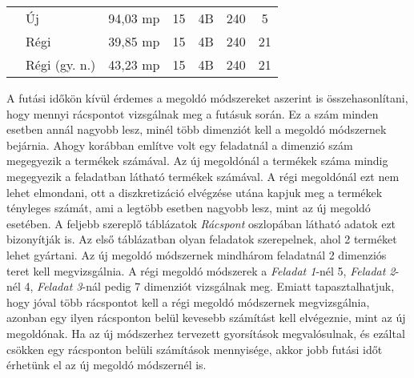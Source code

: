 \begin{table}[H]
\begin{center}
\begin{tabular}{|l|l|c|c|c|c|c|}
                                                 & Új                              & 94,03 mp    & 15           & 4B                & 240    & 5                             \\ \cline{2-7} 
                                                 & Régi                            & 39,85 mp    & 15           & 4B                & 240    & 21                            \\ \cline{2-7} 
                                                 & Régi (gy. n.)                   & 43,23 mp    & 15           & 4B                & 240    & 21                            \\ \hline
\end{tabular}
\end{center}
\end{table}

\newpage
A futási időkön kívül érdemes a megoldó módszereket aszerint is összehasonlítani, hogy mennyi rácspontot vizsgálnak meg a futásuk során. Ez a szám minden esetben annál nagyobb lesz, minél több dimenziót kell a megoldó módszernek bejárnia. Ahogy korábban említve volt egy feladatnál a dimenzió szám megegyezik a termékek számával. Az új megoldónál a termékek száma mindig megegyezik a feladatban látható termékek számával. A régi megoldónál ezt nem lehet elmondani, ott a diszkretizáció elvégzése utána kapjuk meg a termékek tényleges számát, ami a legtöbb esetben nagyobb lesz, mint az új megoldó esetében. A feljebb szereplő táblázatok \textit{Rácspont} oszlopában látható adatok ezt bizonyítják is. Az első táblázatban olyan feladatok szerepelnek, ahol 2 terméket lehet gyártani. Az új megoldó módszernek mindhárom feladatnál 2 dimenziós teret kell megvizsgálnia. A régi megoldó módszerek a \textit{Feladat 1}-nél 5, \textit{Feladat 2}-nél 4, \textit{Feladat 3}-nál pedig 7 dimenziót vizsgálnak meg. Emiatt tapasztalhatjuk, hogy jóval több rácspontot kell a régi megoldó módszernek megvizsgálnia, azonban egy ilyen rácsponton belül kevesebb számítást kell elvégeznie, mint az új megoldónak. Ha az új módszerhez tervezett gyorsítások megvalósulnak, és ezáltal csökken egy rácsponton belüli számítások mennyisége, akkor jobb futási időt érhetünk el az új megoldó módszernél is.